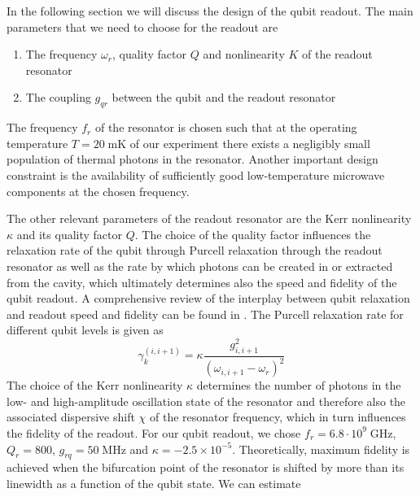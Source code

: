 In the following section we will discuss the design of the qubit readout. The main parameters that we need to choose for the readout are

\begin{enumerate}
\item The frequency $\omega_r$, quality factor $Q$ and nonlinearity $K$ of the readout resonator
\item The coupling $g_{qr}$ between the qubit and the readout resonator
\end{enumerate}

The frequency $f_r$ of the resonator is chosen such that at the operating temperature $T=20\;\mathrm{mK}$ of our experiment there exists a negligibly small population of thermal photons in the resonator. Another important design constraint is the availability of sufficiently good low-temperature microwave components at the chosen frequency.

\smallskip

The other relevant parameters of the readout resonator are the Kerr nonlinearity $\kappa$ and its quality factor $Q$. The choice of the quality factor influences the relaxation rate of the qubit through Purcell relaxation through the readout resonator as well as the rate by which photons can be created in or extracted from the cavity, which ultimately determines also the speed and fidelity of the qubit readout. A comprehensive review of the interplay between qubit relaxation and readout speed and fidelity can be found in \cite{mallet_single-shot_2009}. The Purcell relaxation rate for different qubit levels is given as \citep{koch_charge-insensitive_2007}
%
\begin{equation}
\gamma_k^{(i,i+1)} = \kappa \frac{g_{i,i+1}^2}{(\omega_{i,i+1}-\omega_r)^2}
\end{equation}
%
The choice of the Kerr nonlinearity $\kappa$ determines the number of photons in the low- and high-amplitude oscillation state of the resonator and therefore also the associated dispersive shift $\chi$ of the resonator frequency, which in turn influences the fidelity of the readout. For our qubit readout, we chose $f_r= 6.8\cdot 10^9\;\mathrm{GHz}$, $Q_{r}=800$, $g_{rq}= 50\;\mathrm{MHz}$ and $\kappa=-2.5\times 10^{-5}$. Theoretically, maximum fidelity is achieved when the bifurcation point of the resonator is shifted by more than its linewidth as a function of the qubit state. We can estimate 

